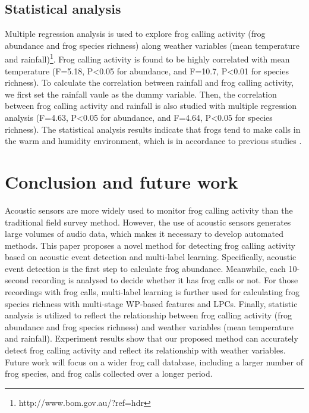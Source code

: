 \subsection{Statistical analysis}
Multiple regression analysis is used to explore frog calling activity (frog abundance and frog species richness) along weather variables (mean temperature and rainfall)\footnote[5] {http://www.bom.gov.au/?ref=hdr}. Frog calling activity is found to be highly correlated with mean temperature (F=5.18, P\textless0.05 for abundance, and F=10.7, P\textless0.01 for species richness). To calculate the correlation between rainfall and frog calling activity, we first set the rainfall vaule as the dummy variable. Then, the correlation between frog calling activity and rainfall is also studied with multiple regression analysis (F=4.63, P\textless0.05 for abundance, and F=4.64, P\textless0.05 for species richness). The statistical analysis results indicate that frogs tend to make calls in the warm and humidity environment, which is in accordance to previous studies \cite{akmentins2015patterns, canavero2008calling}.






\section{Conclusion and future work}
Acoustic sensors are more widely used to monitor frog calling activity than the traditional field survey method. However, the use of acoustic sensors generates large volumes of audio data, which makes it necessary to develop automated methods. This paper proposes a novel method for detecting frog calling activity based on acoustic event detection and multi-label learning. Specifically,
acoustic event detection is the first step to calculate frog abundance. Meanwhile, each 10-second recording is analysed to decide whether it has frog calls or not. For those recordings with frog calls, multi-label learning is further used for calculating frog species richness with multi-stage WP-based features and LPCs. Finally, statistic analysis is utilized to reflect the relationship between frog calling activity (frog abundance and frog species richness) and weather variables (mean temperature and rainfall). Experiment results show that our proposed method can accurately detect frog calling activity and reflect its relationship with weather variables. Future work will focus on a wider frog call database, including a larger number of frog species, and frog calls collected over a longer period.


